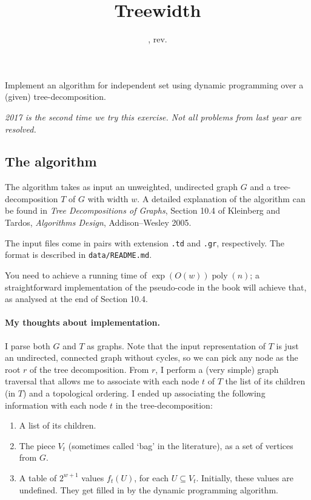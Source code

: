 \documentclass{tufte-handout}
\title{Treewidth}
\date{\GITAuthorDate, rev. \GITAbrHash}
\author{}
\begin{document}
\maketitle

Implement an algorithm for independent set using dynamic programming over a (given) tree-decomposition.

\emph{2017 is the second time we try this exercise. Not all problems from last year are resolved.}

\subsection{The algorithm}

The algorithm takes as input an unweighted, undirected graph $G$ and a tree-decomposition $T$ of $G$ with width $w$.
A detailed explanation of the algorithm can be found in \emph{Tree Decompositions of Graphs}, Section 10.4 of Kleinberg and Tardos, \emph{Algorithms Design}, Addison--Wesley 2005.

The input files come in pairs with extension {\tt .td} and {\tt .gr}, respectively.
The format is described in {\tt data/README.md}.


You need to achieve a running time of $\exp(O(w))\operatorname{poly}(n)$; a straightforward implementation of the pseudo-code in the book will achieve that, as analysed at the end of Section 10.4.

\paragraph{My thoughts about implementation.}
I parse both $G$ and $T$ as graphs.
Note that the input representation of $T$ is just an undirected, connected graph without cycles, so we can pick any node as the root $r$ of the tree decomposition.
From $r$, I perform a (very simple) graph traversal that allows me to associate with each node $t$ of $T$ the list of its children (in $T$) and a topological ordering.
I ended up associating the following information with each node $t$ in the tree-decomposition:
\begin{enumerate}
\item A list of its children.
\item The piece $V_t$ (sometimes called `bag' in the literature), as a set of vertices from $G$.
\item A table of $2^{w+1}$ values $f_t(U)$, for each $U\subseteq V_t$. 
  Initially, these values are undefined.
  They get filled in by the dynamic programming algorithm.
\end{enumerate}
\end{document}
